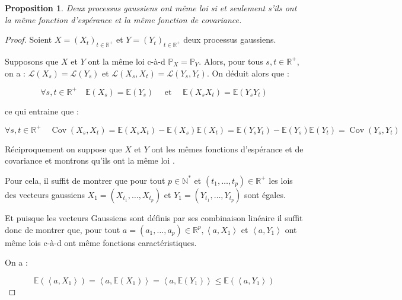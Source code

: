 \documentclass[A4paper,12pt]{report}
\newtheorem{proposition}{Proposition}[chapter]
\newcommand{\pr}{{\mathbb{P}}}
\begin{document}
\begin{proposition}
Deux processus gaussiens ont même loi si et seulement s'ils ont la même fonction d'espérance et la même fonction de covariance.
\end{proposition}
\begin{proof}
Soient $X=\left(X_{t}\right)_{t \in \mathbb{R}^{+}}$ et $Y=\left(Y_{t}\right)_{t \in \mathbb{R}^{+}}$ deux processus gaussiens.

Supposons que $X$ et $Y$ ont la même loi c-à-d $\pr_{X}=\pr_{Y}$. Alors, pour tous $s, t \in \mathbb{R}^{+}$, on a : $\mathcal{L}\left(X_{s}\right)=\mathcal{L}\left(Y_{s}\right)$ et $\mathcal{L}\left(X_{s}, X_{t}\right)=\mathcal{L}\left(Y_{s}, Y_{t}\right)$. On déduit alors que :

$$
\forall s, t \in \mathbb{R}^{+} \quad \mathbb{E}\left(X_{s}\right)=\mathbb{E}\left(Y_{s}\right) \quad \text { et } \quad \mathbb{E}\left(X_{s} X_{t}\right)=\mathbb{E}\left(Y_{s} Y_{t}\right)
$$

ce qui entraine que :

$$
\forall s, t \in \mathbb{R}^{+} \quad \operatorname{Cov}\left(X_{s}, X_{t}\right)=\mathbb{E}\left(X_{s} X_{t}\right)-\mathbb{E}\left(X_{s}\right) \mathbb{E}\left(X_{t}\right)=\mathbb{E}\left(Y_{s} Y_{t}\right)-\mathbb{E}\left(Y_{s}\right) \mathbb{E}\left(Y_{t}\right)=\operatorname{Cov}\left(Y_{s}, Y_{t}\right)
$$

Réciproquement on suppose que $X$ et $Y$ ont les mêmes fonctions d'espérance et de covariance et montrons qu'ils ont la même loi .

Pour cela, il suffit de montrer que pour tout $p \in \mathbb{N}^{*}$ et $\left(t_{1}, \ldots, t_{p}\right) \in \mathbb{R}^{+}$ les lois des vecteurs gaussiens $X_{1}=\left(X_{t_{1}}, \ldots, X_{t_{p}}\right)$ et $Y_{1}=\left(Y_{t_{1}}, \ldots, Y_{t_{p}}\right)$ sont égales.

Et puisque les vecteurs Gaussiens sont définis par ses combinaison linéaire il suffit donc de montrer que, pour tout $a=\left(a_{1}, \ldots, a_{p}\right) \in \mathbb{R}^{p},\left\langle a, X_{1}\right\rangle$ et $\left\langle a, Y_{1}\right\rangle$ ont même lois c-à-d ont même fonctions caractéristiques.

On a :

$$
\mathbb{E}\left(\left\langle a, X_{1}\right\rangle\right)=\left\langle a, \mathbb{E}\left(X_{1}\right)\right\rangle=\left\langle a, \mathbb{E}\left(Y_{1}\right)\right\rangle \leq \mathbb{E}\left(\left\langle a, Y_{1}\right\rangle\right)
$$


\end{proof}
\end{document}
